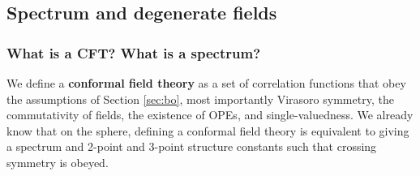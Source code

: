 \documentclass[12pt, a4paper]{article}
\theoremstyle{break}
\begin{document}
\subsection{Spectrum and degenerate fields}

\subsubsection{What is a CFT? What is a spectrum?}

We define a \textbf{conformal field theory} as a set of correlation functions that obey the assumptions of Section \ref{sec:bo}, most importantly Virasoro symmetry, the commutativity of fields, the existence of OPEs, and single-valuedness. We already know that on the sphere, defining a conformal field theory is equivalent to giving a spectrum and 2-point and 3-point structure constants such that crossing symmetry is obeyed.
\end{document}
